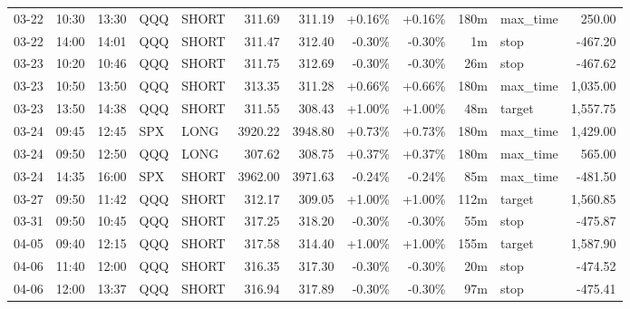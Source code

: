 \documentclass[11pt,a4paper,twoside]{article}
\begin{document}
\begin{center}
\begin{longtable}{>{\color{txtmain}}l l l l l r r r r r >{\color{txtmain}}l r}
03-22 & 10:30 & 13:30 & QQQ & SHORT & 311.69 & 311.19 & \textcolor{wingreen}{+0.16\%} & \textcolor{wingreen}{+0.16\%} & 180m & max\_time & \textcolor{wingreen}{250.00} \\
03-22 & 14:00 & 14:01 & QQQ & SHORT & 311.47 & 312.40 & \textcolor{lossred}{-0.30\%} & \textcolor{lossred}{-0.30\%} & 1m & stop & \textcolor{lossred}{-467.20} \\
03-23 & 10:20 & 10:46 & QQQ & SHORT & 311.75 & 312.69 & \textcolor{lossred}{-0.30\%} & \textcolor{lossred}{-0.30\%} & 26m & stop & \textcolor{lossred}{-467.62} \\
03-23 & 10:50 & 13:50 & QQQ & SHORT & 313.35 & 311.28 & \textcolor{wingreen}{+0.66\%} & \textcolor{wingreen}{+0.66\%} & 180m & max\_time & \textcolor{wingreen}{1,035.00} \\
03-23 & 13:50 & 14:38 & QQQ & SHORT & 311.55 & 308.43 & \textcolor{wingreen}{+1.00\%} & \textcolor{wingreen}{+1.00\%} & 48m & target & \textcolor{wingreen}{1,557.75} \\
03-24 & 09:45 & 12:45 & SPX & LONG & 3920.22 & 3948.80 & \textcolor{wingreen}{+0.73\%} & \textcolor{wingreen}{+0.73\%} & 180m & max\_time & \textcolor{wingreen}{1,429.00} \\
03-24 & 09:50 & 12:50 & QQQ & LONG & 307.62 & 308.75 & \textcolor{wingreen}{+0.37\%} & \textcolor{wingreen}{+0.37\%} & 180m & max\_time & \textcolor{wingreen}{565.00} \\
03-24 & 14:35 & 16:00 & SPX & SHORT & 3962.00 & 3971.63 & \textcolor{lossred}{-0.24\%} & \textcolor{lossred}{-0.24\%} & 85m & max\_time & \textcolor{lossred}{-481.50} \\
03-27 & 09:50 & 11:42 & QQQ & SHORT & 312.17 & 309.05 & \textcolor{wingreen}{+1.00\%} & \textcolor{wingreen}{+1.00\%} & 112m & target & \textcolor{wingreen}{1,560.85} \\
03-31 & 09:50 & 10:45 & QQQ & SHORT & 317.25 & 318.20 & \textcolor{lossred}{-0.30\%} & \textcolor{lossred}{-0.30\%} & 55m & stop & \textcolor{lossred}{-475.87} \\
04-05 & 09:40 & 12:15 & QQQ & SHORT & 317.58 & 314.40 & \textcolor{wingreen}{+1.00\%} & \textcolor{wingreen}{+1.00\%} & 155m & target & \textcolor{wingreen}{1,587.90} \\
04-06 & 11:40 & 12:00 & QQQ & SHORT & 316.35 & 317.30 & \textcolor{lossred}{-0.30\%} & \textcolor{lossred}{-0.30\%} & 20m & stop & \textcolor{lossred}{-474.52} \\
04-06 & 12:00 & 13:37 & QQQ & SHORT & 316.94 & 317.89 & \textcolor{lossred}{-0.30\%} & \textcolor{lossred}{-0.30\%} & 97m & stop & \textcolor{lossred}{-475.41} \\

\end{longtable}
\end{center}
\end{document}
